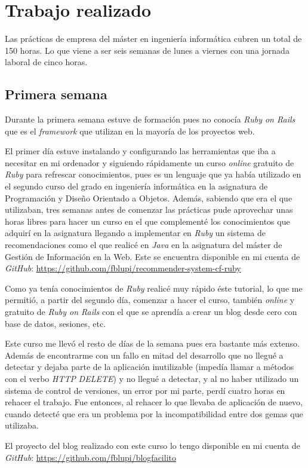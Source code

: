 \chapter{Trabajo realizado}

Las prácticas de empresa del máster en ingeniería informática cubren un total de 150 horas. Lo que viene a ser seis semanas de lunes a viernes con una jornada laboral de cinco horas.

\section{Primera semana}

Durante la primera semana estuve de formación pues no conocía \textit{Ruby on Rails} que es el \textit{framework} que utilizan en la mayoría de los proyectos web.

El primer día estuve instalando y configurando las herramientas que iba a necesitar en mi ordenador y siguiendo rápidamente un curso \textit{online} gratuito de \textit{Ruby} para refrescar conocimientos, pues es un lenguaje que ya había utilizado en el segundo curso del grado en ingeniería informática en la asignatura de Programación y Diseño Orientado a Objetos. Además, sabiendo que era el que utilizaban, tres semanas antes de comenzar las prácticas pude aprovechar unas horas libres para hacer un curso en el que complementé los conocimientos que adquirí en la asignatura llegando a implementar en \textit{Ruby} un sistema de recomendaciones como el que realicé en \textit{Java} en la asignatura del máster de Gestión de Información en la Web. Este se encuentra disponible en mi cuenta de \textit{GitHub}: \url{https://github.com/fblupi/recommender-system-cf-ruby}

Como ya tenía conocimientos de \textit{Ruby} realicé muy rápido éste tutorial, lo que me permitió, a partir del segundo día, comenzar a hacer el curso, también \textit{online} y gratuito de \textit{Ruby on Rails} con el que se aprendía a crear un blog desde cero con base de datos, sesiones, etc.

Este curso me llevó el resto de días de la semana pues era bastante más extenso. Además de encontrarme con un fallo en mitad del desarrollo que no llegué a detectar y dejaba parte de la aplicación inutilizable (impedía llamar a métodos con el verbo \textit{HTTP} \textit{DELETE}) y no llegué a detectar, y al no haber utilizado un sistema de control de versiones, un error por mi parte, perdí cuatro horas en rehacer el trabajo. Fue entonces, al rehacer lo que llevaba de aplicación de nuevo, cuando detecté que era un problema por la incompatibilidad entre dos gemas que utilizaba.

El proyecto del blog realizado con este curso lo tengo disponible en mi cuenta de \textit{GitHub}: \url{https://github.com/fblupi/blogfacilito}
